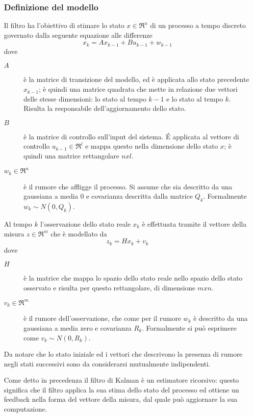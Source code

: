 \subsubsection{Definizione del modello}
Il filtro ha l'obiettivo di stimare lo stato $x \in \Re^n$ di un processo a tempo discreto governato dalla seguente equazione alle differenze
\begin{equation}\label{eq:x}
 x_k=Ax_{k-1}+Bu_{k-1}+w_{k-1}
\end{equation} 
dove 
\begin{description}
 \item [$A$] è la matrice di transizione del modello, ed è applicata allo stato precedente $x_{k-1}$; è quindi una matrice quadrata che mette in relazione due vettori delle stesse dimensioni: lo stato al tempo $k-1$ e lo stato al tempo $k$. Risulta la responsabile dell'aggiornamento dello stato.
\item [$B$] è la matrice di controllo sull'input del sistema. \'E applicata al vettore di controllo $u_{k-1} \in \Re^l$ e mappa questo nella dimensione dello stato $x$; è quindi una matrice rettangolare $nxl$.
\item [$w_k \in \Re^n$] è il rumore che affligge il processo. Si assume che sia descritto da una gaussiana a media $0$ e covarianza descritta dalla matrice $Q_k$. Formalmente $w_k \sim N(0,Q_k)$.
\end{description}

Al tempo $k$ l'osservazione dello stato reale $x_k$ è effettuata tramite il vettore della misura $z \in \Re^m$ che è modellato da
\begin{equation}\label{eq:z}
z_k=Hx_k+v_k
\end{equation}
dove 
\begin{description}
 \item [$H$] è la matrice che mappa lo spazio dello stato reale nello spazio dello stato osservato e risulta per questo rettangolare, di dimensione $mxn$.
\item [$v_k \in \Re^m$] è il rumore dell'osservazione, che come per il rumore $w_k$ è descritto da una gaussiana a media zero e covarianza $R_k$. Formalmente si può esprimere come $v_k \sim N(0,R_k)$.
\end{description}
 Da notare che lo stato iniziale ed i vettori che descrivono la presenza di rumore negli stati successivi sono da considerarsi mutualmente indipendenti.

Come detto in precedenza il filtro di Kalman è un estimatore ricorsivo: questo significa che il filtro applica la sua stima dello stato del processo ed ottiene un feedback nella forma del vettore della misura, dal quale può aggiornare la sua computazione. 

